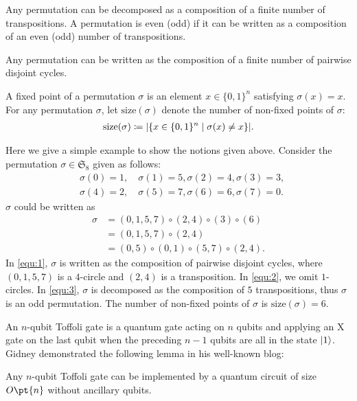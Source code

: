 \documentclass[a4paper,UKenglish,cleveref, autoref, thm-restate]{lipics-v2021}
\DeclarePairedDelimiter\abs{\lvert}{\rvert}
\newcommand{\bo}{O\pt}
\begin{document}
 Any permutation can be decomposed as a composition of a finite number of transpositions. A permutation is even (odd) if it can be written as a composition of an even (odd) number of transpositions. 
 
 \begin{lemma}\label{lm: permutation-dec}
 Any permutation can be written as the composition of a finite number of pairwise disjoint cycles.
 \end{lemma}
 
 A fixed point of a permutation $\sigma$ is an element $x \in \{0, 1\}^n$ satisfying $\sigma(x) = x$. 
 For any permutation $\sigma$, let $\mathrm{size}(\sigma)$ denote the number of non-fixed points of $\sigma$:
\begin{align}\label{eq:non-fixed}
    \mathrm{size}(\sigma) \coloneqq \abs{\{x \in \{0, 1\}^n \mid \sigma(x) \neq x\}}.
\end{align}

Here we give a simple example to show the notions given above. Consider the permutation $\sigma \in \mathfrak{S}_8$ given as follows:
\begin{align*}
    & \sigma(0) = 1, \quad \sigma(1) = 5, \sigma(2) = 4, \sigma(3) = 3, \\
    & \sigma(4) = 2, \quad \sigma(5) = 7, \sigma(6) = 6, \sigma(7) = 0. 
\end{align*}
$\sigma$ could be written as 
\begin{align}
    \sigma & = (0, 1, 5, 7) \circ (2, 4) \circ (3) \circ (6) \label{equ:1} \\
    & =  (0, 1, 5, 7) \circ (2, 4) \label{equ:2} \\
    & = (0, 5) \circ (0, 1) \circ (5, 7) \circ (2, 4). \label{equ:3}
\end{align}
In \cref{equ:1}, $\sigma$ is written as the composition of pairwise disjoint cycles, where $(0, 1, 5, 7)$ is a $4$-circle and $(2, 4)$ is a transposition. In \cref{equ:2}, we omit $1$-circles. In \cref{equ:3}, $\sigma$ is decomposed as the composition of $5$ transpositions, thus $\sigma$ is an odd permutation. The number of non-fixed points of $\sigma$ is $\mathrm{size}(\sigma)=6$.

An $n$-qubit Toffoli gate is a quantum gate acting on $n$ qubits and applying an X gate on the last qubit when the preceding $n-1$ qubits are all in the state $\ket{1}$. Gidney \cite{gidney2015} demonstrated the following lemma in his well-known blog:

\begin{lemma}\label{lemma:gidney}
    Any $n$-qubit Toffoli gate can be implemented by a quantum circuit of size $\bo{n}$ without ancillary qubits.
\end{lemma}
\end{document}
